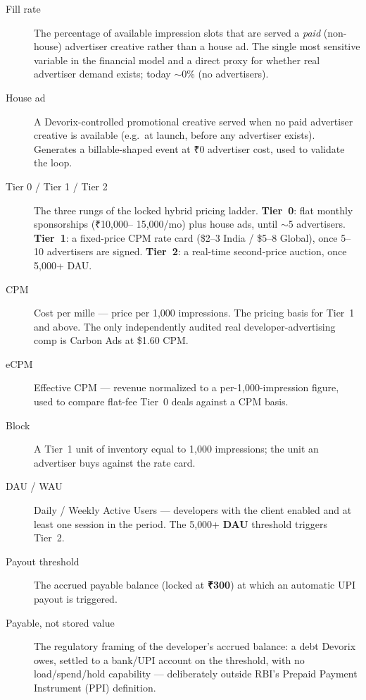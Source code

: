 \begin{description}
  \item[Fill rate] The percentage of available impression slots that are
        served a \emph{paid} (non-house) advertiser creative rather than a
        house ad. The single most sensitive variable in the financial model and
        a direct proxy for whether real advertiser demand exists; today
        $\sim$0\% (no advertisers).

  \item[House ad] A Devorix-controlled promotional creative served when no paid
        advertiser creative is available (e.g.\ at launch, before any
        advertiser exists). Generates a billable-shaped event at ₹0
        advertiser cost, used to validate the loop.

  \item[Tier 0 / Tier 1 / Tier 2] The three rungs of the locked hybrid pricing
        ladder. \textbf{Tier~0}: flat monthly sponsorships (₹10{,}000--
        15{,}000/mo) plus house ads, until $\sim$5 advertisers.
        \textbf{Tier~1}: a fixed-price CPM rate card (\$2--3 India / \$5--8
        Global), once 5--10 advertisers are signed. \textbf{Tier~2}: a
        real-time second-price auction, once 5{,}000+ DAU.

  \item[CPM] Cost per mille --- price per 1{,}000 impressions. The pricing
        basis for Tier~1 and above. The only independently audited real
        developer-advertising comp is Carbon Ads at \$1.60 CPM.

  \item[eCPM] Effective CPM --- revenue normalized to a per-1{,}000-impression
        figure, used to compare flat-fee Tier~0 deals against a CPM basis.

  \item[Block] A Tier~1 unit of inventory equal to 1{,}000 impressions; the
        unit an advertiser buys against the rate card.

  \item[DAU / WAU] Daily / Weekly Active Users --- developers with the client
        enabled and at least one session in the period. The 5{,}000+ \textbf{DAU}
        threshold triggers Tier~2.

  \item[Payout threshold] The accrued payable balance (locked at
        \textbf{₹300}) at which an automatic UPI payout is triggered.

  \item[Payable, not stored value] The regulatory framing of the developer's
        accrued balance: a debt Devorix owes, settled to a bank/UPI account on
        the threshold, with no load/spend/hold capability --- deliberately
        outside RBI's Prepaid Payment Instrument (PPI) definition.


\end{description}
